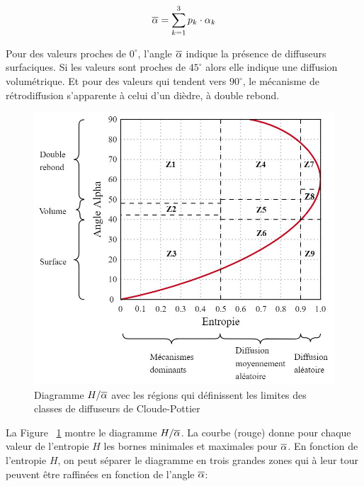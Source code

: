 \begin{equation}  
    \overline{\alpha} =  \sum_{k=1}^{3}p_k \cdot \alpha_k
\end{equation}

\vspace{10pt}

 Pour des valeurs proches de $0^{\circ}$, l’angle $\overline{\alpha}$  indique la présence de diffuseurs surfaciques. Si les
valeurs sont proches de  $45^{\circ}$ alors elle indique une diffusion volumétrique. Et pour des
valeurs qui tendent vers  $90^{\circ}$, le mécanisme de rétrodiffusion s'apparente à celui d’un dièdre, à double rebond.
\begin{figure}[!htbp] 
  \includegraphics[width=1.0 \linewidth]{figures/haalpha-diagram.jpg}
   \centering
        \caption
        {\small Diagramme $H/\overline{\alpha}$ avec les régions qui définissent les limites des classes de diffuseurs de Cloude-Pottier}
  \label{fig:haalpha-diagram}
\end{figure}

La Figure ~\ref{fig:haalpha-diagram} montre le diagramme $H/\overline{\alpha}$. La courbe (rouge) donne pour chaque
valeur de l’entropie $H$ les bornes minimales et maximales pour $\overline{\alpha}$.  En fonction de l'entropie $H$, on peut séparer le diagramme en trois grandes zones qui à leur tour peuvent être raffinées en fonction de l'angle $\overline{\alpha}$:



